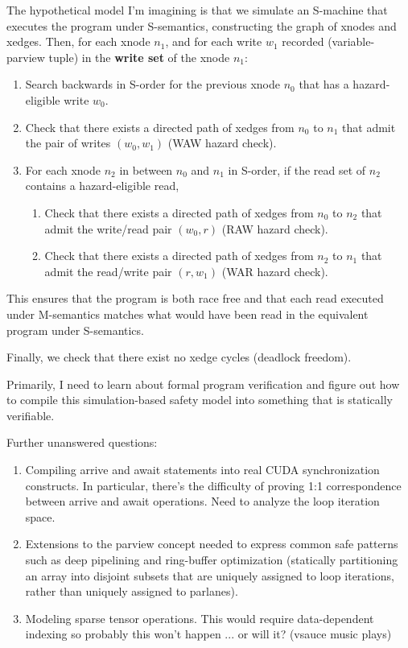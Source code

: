 The hypothetical model I'm imagining is that we simulate an S-machine that executes the program under S-semantics, constructing the graph of xnodes and xedges. Then, for each xnode $n_1$, and for each write $w_1$ recorded (variable-parview tuple) in the \textbf{write set} of the xnode $n_1$:
\begin{enumerate}
  \item Search backwards in S-order for the previous xnode $n_0$ that has a hazard-eligible write $w_0$.
  \item Check that there exists a directed path of xedges from $n_0$ to $n_1$ that admit the pair of writes $(w_0, w_1)$ (WAW hazard check).
  \item For each xnode $n_2$ in between $n_0$ and $n_1$ in S-order, if the read set of $n_2$ contains a hazard-eligible read,
  \begin{enumerate}
    \item Check that there exists a directed path of xedges from $n_0$ to $n_2$ that admit the write/read pair $(w_0, r)$ (RAW hazard check).
    \item Check that there exists a directed path of xedges from $n_2$ to $n_1$ that admit the read/write pair $(r, w_1)$ (WAR hazard check).
  \end{enumerate}
\end{enumerate}
This ensures that the program is both race free and that each read executed under M-semantics matches what would have been read in the equivalent program under S-semantics.

Finally, we check that there exist no xedge cycles (deadlock freedom).

\filbreak
{}

Primarily, I need to learn about formal program verification and figure out how to compile this simulation-based safety model into something that is statically verifiable.

Further unanswered questions:
\begin{enumerate}
  \item Compiling arrive and await statements into real CUDA synchronization constructs.
    In particular, there's the difficulty of proving 1:1 correspondence between arrive and await operations.
    Need to analyze the loop iteration space.
  \item Extensions to the parview concept needed to express common safe patterns such as deep pipelining and ring-buffer optimization (statically partitioning an array into disjoint subsets that are uniquely assigned to loop iterations, rather than uniquely assigned to parlanes).
  \item Modeling sparse tensor operations. This would require data-dependent indexing so probably this won't happen ... or will it? (vsauce music plays)
\end{enumerate}

